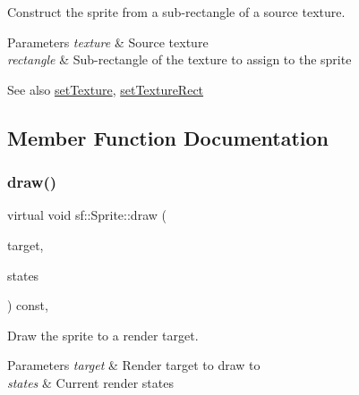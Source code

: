Construct the sprite from a sub-\/rectangle of a source texture. 


\begin{DoxyParams}{Parameters}
{\em texture} & Source texture \\
\hline
{\em rectangle} & Sub-\/rectangle of the texture to assign to the sprite\\
\hline
\end{DoxyParams}
\begin{DoxySeeAlso}{See also}
\mbox{\hyperlink{classsf_1_1_sprite_a3729c88d88ac38c19317c18e87242560}{set\+Texture}}, \mbox{\hyperlink{classsf_1_1_sprite_a3fefec419a4e6a90c0fd54c793d82ec2}{set\+Texture\+Rect}} \begin{DoxyVerb}\end{DoxyVerb}
 
\end{DoxySeeAlso}


\subsection{Member Function Documentation}
\mbox{\label{classsf_1_1_sprite_ad6ab20148c4ba6d6fc33a4aaf5eb838b}} 
\subsubsection{\texorpdfstring{draw()}{draw()}}
{\footnotesize\ttfamily virtual void sf\+::\+Sprite\+::draw (\begin{DoxyParamCaption}\item[{\mbox{\hyperlink{classsf_1_1_render_target}{Render\+Target}} \&}]{target,  }\item[{\mbox{\hyperlink{classsf_1_1_render_states}{Render\+States}}}]{states }\end{DoxyParamCaption}) const\hspace{0.3cm}{\ttfamily [private]}, {\ttfamily [virtual]}}



Draw the sprite to a render target. 


\begin{DoxyParams}{Parameters}
{\em target} & Render target to draw to \\
\hline
{\em states} & Current render states \begin{DoxyVerb}\end{DoxyVerb}
 \\
\hline
\end{DoxyParams}


